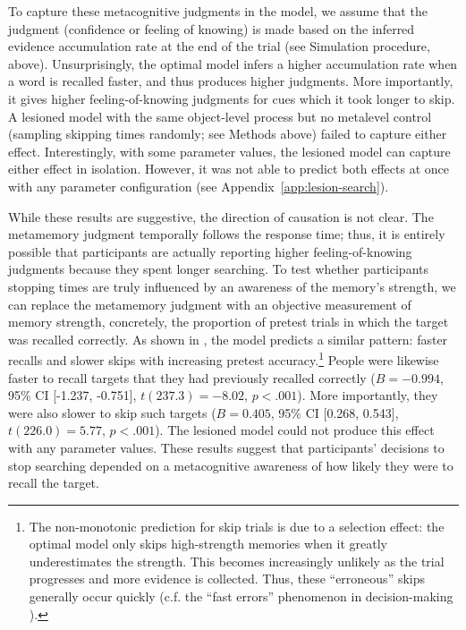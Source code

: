 To capture these metacognitive judgments in the model, we assume that the judgment (confidence or feeling of knowing) is made based on the inferred evidence accumulation rate at the end of the trial (see Simulation procedure, above). Unsurprisingly, the optimal model infers a higher accumulation rate when a word is recalled faster, and thus produces higher judgments. More importantly, it gives higher feeling-of-knowing judgments for cues which it took longer to skip. A lesioned model with the same object-level process but no metalevel control (sampling skipping times randomly; see Methods above) failed to capture either effect. Interestingly, with some parameter values, the lesioned model can capture either effect in isolation. However, it was not able to predict both effects at once with any parameter configuration (see Appendix~\ref{app:lesion-search}).

While these results are suggestive, the direction of causation is not clear. The metamemory judgment temporally follows the response time; thus, it is entirely possible that participants are actually reporting higher feeling-of-knowing judgments because they spent longer searching. To test whether participants stopping times are truly influenced by an awareness of the memory's strength, we can replace the metamemory judgment with an objective measurement of memory strength, concretely, the proportion of pretest trials in which the target was recalled correctly. As shown in , the model predicts a similar pattern: faster recalls and slower skips with increasing pretest accuracy.\footnote{%
    The non-monotonic prediction for skip trials is due to a selection effect: the optimal model only skips high-strength memories when it greatly underestimates the strength. This becomes increasingly unlikely as the trial progresses and more evidence is collected. Thus, these ``erroneous'' skips generally occur quickly (c.f. the ``fast errors'' phenomenon in decision-making  \citealp{ratcliff1998modeling}).
    }
People were likewise faster to recall targets that they had previously recalled correctly ($B = -0.994$, 95\% CI [-1.237, -0.751], $t(237.3)=-8.02$, $p < .001$). More importantly, they were also slower to skip such targets ($B = 0.405$, 95\% CI [0.268, 0.543], $t(226.0)=5.77$, $p < .001$). The lesioned model could not produce this effect with any parameter values. These results suggest that participants' decisions to stop searching depended on a metacognitive awareness of how likely they were to recall the target.


